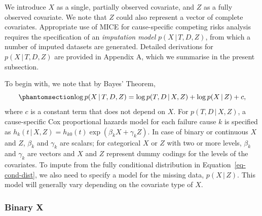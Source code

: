 \documentclass[
  letterpaper,
  paper=240mm:170mm,
  twoside=true,
  open=right,
  fontsize=10pt,
  pagesize=false,
  BCOR=15mm,
  DIV=14,
  headinclude=true,
  footinclude=false,
  headsepline=on]{scrbook}
\newcommand{\given}{\,|\,}
\begin{document}
We introduce \(X\) as a single, partially observed covariate, and \(Z\)
as a fully observed covariate. We note that \(Z\) could also represent a
vector of complete covariates. Appropriate use of MICE for
cause-specific competing risks analysis requires the specification of an
\emph{imputation model} \(p(X \given T,D,Z)\), from which a number of
imputed datasets are generated. Detailed derivations for
\(p(X \given T,D,Z)\) are provided in Appendix A, which we summarise in
the present subsection.

To begin with, we note that by Bayes' Theorem,
\begin{equation}\phantomsection\label{eq-cond-dist}{
    \log p(X \given T,D,Z) = \log p(T,D \given X, Z) + \log p(X \given Z) + c,
}\end{equation} where \(c\) is a constant term that does not depend on
\(X\). For \(p(T,D \given X, Z)\), a cause-specific Cox proportional
hazards model for each failure cause \(k\) is specified as
\(h_k(t \given X, Z) = h_{k0}(t)\exp(\beta_k X + \gamma_k Z)\). In case
of binary or continuous \(X\) and \(Z\), \(\beta_k\) and \(\gamma_k\)
are scalars; for categorical \(X\) or \(Z\) with two or more levels,
\(\beta_k\) and \(\gamma_k\) are vectors and \(X\) and \(Z\) represent
dummy codings for the levels of the covariates. To impute from the fully
conditional distribution in Equation~\ref{eq-cond-dist}, we also need to
specify a model for the missing data, \(p(X \given Z)\). This model will
generally vary depending on the covariate type of \(X\).

\subsubsection{Binary X}\label{binary-x}
\end{document}
